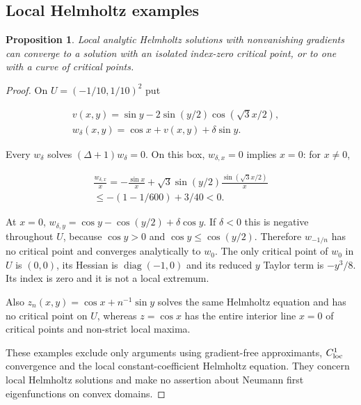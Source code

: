 \documentclass[11pt]{article}
\newtheorem{proposition}[theorem]{Proposition}
\theoremstyle{definition}
\theoremstyle{remark}
\numberwithin{equation}{section}
\begin{document}
\subsection{Local Helmholtz examples}\label{subsec:6.3}
\begin{proposition}\label{prop:helmholtz-examples}
Local analytic Helmholtz solutions with nonvanishing gradients can converge to a solution with an isolated index-zero critical point, or to one with a curve of critical points.
\end{proposition}
\begin{proof}

On $U=(-1/10,1/10)^2$ put

\begin{equation}\label{eq:src-6-02}
\begin{gathered}
v(x,y)=\sin y-2\sin(y/2)\cos(\sqrt3x/2),\quad \\
w_\delta(x,y)=\cos x+v(x,y)+\delta\sin y.
\end{gathered}
\end{equation}

Every $w_\delta$ solves $(\Delta+1)w_\delta=0$. On this box, $w_{\delta,x}=0$ implies $x=0$: for $x\ne0$,

\begin{equation}\label{eq:src-6-03}
\begin{gathered}
\frac{w_{\delta,x}}x=-\frac{\sin x}x+\sqrt3\sin(y/2)\frac{\sin(\sqrt3x/2)}x \\
\le-(1-1/600)+3/40<0.
\end{gathered}
\end{equation}

At $x=0$, $w_{\delta,y}=\cos y-\cos(y/2)+\delta\cos y$. If $\delta<0$ this is negative throughout $U$, because $\cos y>0$ and $\cos y\le\cos(y/2)$. Therefore $w_{-1/n}$ has no critical point and converges analytically to $w_0$. The only critical point of $w_0$ in $U$ is $(0,0)$, its Hessian is $\operatorname{diag}(-1,0)$ and its reduced $y$ Taylor term is $-y^3/8$. Its index is zero and it is not a local extremum.

Also $z_n(x,y)=\cos x+n^{-1}\sin y$ solves the same Helmholtz equation and has no critical point on $U$, whereas $z=\cos x$ has the entire interior line $x=0$ of critical points and non-strict local maxima.

These examples exclude only arguments using gradient-free approximants, $C^1_{\rm loc}$ convergence and the local constant-coefficient Helmholtz equation. They concern local Helmholtz solutions and make no assertion about Neumann first eigenfunctions on convex domains.

\end{proof}
\end{document}
